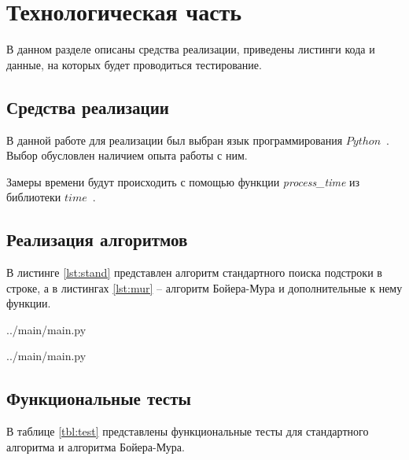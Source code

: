 \chapter{Технологическая часть}

В данном разделе описаны средства реализации, приведены листинги кода
и данные, на которых будет проводиться
тестирование.

\section{Средства реализации}

В данной работе для реализации был выбран язык программирования $Python$~\cite{Python}. 
Выбор обусловлен наличием опыта работы с ним. 

Замеры времени будут происходить с помощью функции \textit{process\_time} из библиотеки $time$~\cite{PC}. 

\section{Реализация алгоритмов}

В листинге \ref{lst:stand} представлен алгоритм стандартного поиска подстроки в строке, а в
листингах \ref{lst:mur} -- алгоритм Бойера-Мура и дополнительные к нему функции.

\noindent
\begin{lstinputlisting}[
	caption={Стандартный алгоритм поиска подстроки в строки},
	label={lst:stand},
	linerange={1-26}
]{../main/main.py}
\end{lstinputlisting}

\noindent
\begin{lstinputlisting}[
	caption={Алгоритм Бойера-Мура для поиска подстроки в строке},
	label={lst:mur},
	linerange={27-106}
]{../main/main.py}
\end{lstinputlisting}

\section{Функциональные тесты}
В таблице \ref{tbl:test} представлены функциональные тесты для стандартного алгоритма и алгоритма Бойера-Мура.

